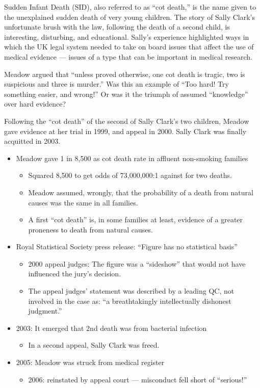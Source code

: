\documentclass[
  10pt,
  b5paper]{book}
\providecommand{\tightlist}{%
  \setlength{\itemsep}{0pt}\setlength{\parskip}{0pt}}
\begin{document}
Sudden Infant Death (SID), also referred to as ``cot death,''
is the name given to the unexplained sudden death of very
young children. The story of Sally Clark's unfortunate brush
with the law, following the death of a second child, is
interesting, disturbing, and educational. Sally's experience
highlighted ways in which the UK legal system needed to take
on board issues that affect the use of medical evidence ---
issues of a type that can be important in medical research.

Meadow argued that ``unless proved otherwise, one cot death is tragic,
two is suspicious and three is murder.''
Was this an example of ``Too hard! Try something easier, and wrong!''
Or was it the triumph of assumed ``knowledge'' over hard evidence?

Following the ``cot death'' of the second of Sally Clark's two children,
Meadow gave evidence at her trial in 1999, and appeal
in 2000. Sally Clark was finally acquitted in 2003.

\begin{itemize}
\tightlist
\item
  Meadow gave 1 in 8,500 as cot death rate in affluent non-smoking families

  \begin{itemize}
  \tightlist
  \item
    Squared 8,500 to get odds of 73,000,000:1 against for two deaths.
  \item
    Meadow assumed, wrongly, that the probability of a death from
    natural causes was the same in all families.
  \item
    A first ``cot death'' is, in some families at least, evidence of a greater
    proneness to death from natural causes.
  \end{itemize}
\item
  Royal Statistical Society press release: ``Figure has no statistical basis''

  \begin{itemize}
  \tightlist
  \item
    2000 appeal judges: The figure was a
    ``sideshow'' that would not have influenced the jury's decision.
  \item
    The appeal judges' statement was described by a leading QC, not
    involved in the case as: ``a breathtakingly intellectually dishonest
    judgment.''
  \end{itemize}
\item
  2003: It emerged that 2nd death was from bacterial infection

  \begin{itemize}
  \tightlist
  \item
    In a second appeal, Sally Clark was freed.
  \end{itemize}
\item
  2005: Meadow was struck from medical register

  \begin{itemize}
  \tightlist
  \item
    2006: reinstated by appeal court --- misconduct fell short of ``serious!''
  \end{itemize}
\end{itemize}
\end{document}

